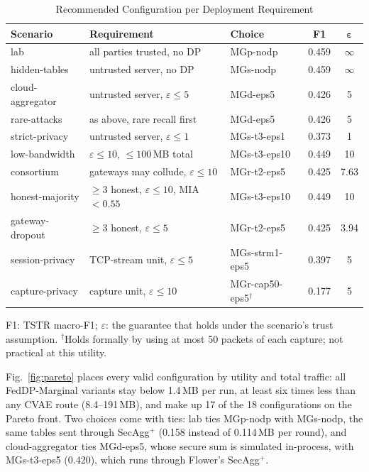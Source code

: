 \begin{table}[!t]
\centering
\caption{Recommended Configuration per Deployment Requirement}
\label{tab:recommend}
\scriptsize
\setlength{\tabcolsep}{2.5pt}
\begin{tabularx}{\columnwidth}{l >{\raggedright\arraybackslash}X l c c}
\toprule
\textbf{Scenario} & \textbf{Requirement} & \textbf{Choice} & \textbf{F1} & $\boldsymbol{\varepsilon}$ \\
\midrule
lab              & all parties trusted, no DP           & MGp-nodp       & 0.459 & $\infty$ \\
hidden-tables    & untrusted server, no DP              & MGs-nodp       & 0.459 & $\infty$ \\
cloud-aggregator & untrusted server, $\varepsilon \le 5$ & MGd-eps5      & 0.426 & 5 \\
rare-attacks     & as above, rare recall first          & MGd-eps5       & 0.426 & 5 \\
strict-privacy   & untrusted server, $\varepsilon \le 1$ & MGs-t3-eps1   & 0.373 & 1 \\
low-bandwidth    & $\varepsilon \le 10$, $\le 100$\,MB total & MGs-t3-eps10 & 0.449 & 10 \\
consortium       & gateways may collude, $\varepsilon \le 10$ & MGr-t2-eps5 & 0.425 & 7.63 \\
honest-majority  & $\ge 3$ honest, $\varepsilon \le 10$, MIA $< 0.55$ & MGs-t3-eps10 & 0.449 & 10 \\
gateway-dropout  & $\ge 3$ honest, $\varepsilon \le 5$  & MGr-t2-eps5    & 0.425 & 3.94 \\
session-privacy  & TCP-stream unit, $\varepsilon \le 5$ & MGs-strm1-eps5 & 0.397 & 5 \\
capture-privacy  & capture unit, $\varepsilon \le 10$  & MGr-cap50-eps5$^\dagger$ & 0.177 & 5 \\
\bottomrule
\end{tabularx}

\vspace{2pt}
\parbox{\columnwidth}{\scriptsize F1: TSTR macro-F1; $\varepsilon$: the guarantee that holds under the scenario's trust assumption. $^\dagger$Holds formally by using at most 50 packets of each capture; not practical at this utility.}
\end{table}

Fig.~\ref{fig:pareto} places every valid configuration by utility and total traffic: all FedDP-Marginal variants stay below 1.4\,MB per run, at least six times less than any CVAE route (8.4--191\,MB), and make up 17 of the 18 configurations on the Pareto front. Two choices come with ties: lab ties MGp-nodp with MGs-nodp, the same tables sent through SecAgg$^+$ (0.158 instead of 0.114\,MB per round), and cloud-aggregator ties MGd-eps5, whose secure sum is simulated in-process, with MGs-t3-eps5 (0.420), which runs through Flower's SecAgg$^+$.

